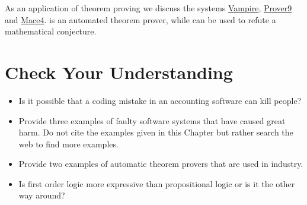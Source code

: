 \begin{enumerate}[(a)]
      As an application of theorem proving we discuss the systems \href{https://vprover.github.io/}{Vampire},
      \href{https://www.cs.unm.edu/~mccune/mace4/}{Prover9} and
      \href{https://www.cs.unm.edu/~mccune/mace4/}{Mace4}.  is an automated theorem prover, while
       can be used to refute a mathematical conjecture.
\end{enumerate}

\section{Check Your Understanding}
\begin{itemize}
\item Is it possible that a coding mistake in an accounting software can kill people?
\item Provide three examples of faulty software systems that have caused great harm.
      Do not cite the examples given in this Chapter but rather search the web to find more examples.
  
\item Provide two examples of automatic theorem provers that are used in industry.
\item Is first order logic more expressive than propositional logic or is it the other way around?
\end{itemize}


